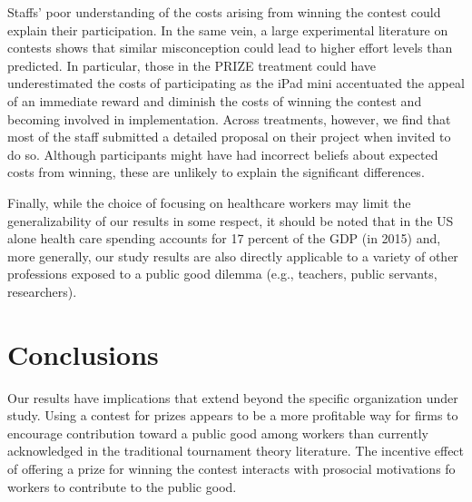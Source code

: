 \documentclass[12pt, titlepage]{article}
\begin{document}
Staffs' poor understanding of the costs arising from winning the contest
could explain their participation. In the same vein, a large
experimental literature on contests \citep{dechenaux2014survey} shows
that similar misconception could lead to higher effort levels than
predicted. In particular, those in the PRIZE treatment could have
underestimated the costs of participating as the iPad mini accentuated
the appeal of an immediate reward and diminish the costs of winning the
contest and becoming involved in implementation. Across treatments,
however, we find that most of the staff submitted a detailed proposal on
their project when invited to do so. Although participants might have
had incorrect beliefs about expected costs from winning, these are
unlikely to explain the significant differences.

Finally, while the choice of focusing on healthcare workers may limit
the generalizability of our results in some respect, it should be noted
that in the US alone health care spending accounts for 17 percent of the
GDP (in 2015) and, more generally, our study results are also directly
applicable to a variety of other professions exposed to a public good
dilemma (e.g., teachers, public servants, researchers).

\section{Conclusions}\label{conclusions}

Our results have implications that extend beyond the specific
organization under study. Using a contest for prizes appears to be a
more profitable way for firms to encourage contribution toward a public
good among workers than currently acknowledged in the traditional
tournament theory literature. The incentive effect of offering a prize
for winning the contest interacts with prosocial motivations fo workers
to contribute to the public good.

\footnotesize
\linespread{1}


\end{document}
